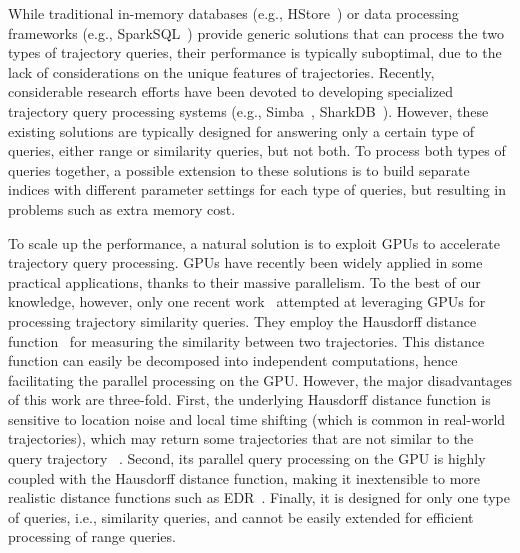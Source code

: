 \documentclass[10pt,conference,letterpaper]{IEEEtran}
\begin{document}
While traditional in-memory databases (e.g., HStore~\cite{DBLP:journals/pvldb/KallmanKNPRZJMSZHA08}) or data processing frameworks (e.g., SparkSQL~\cite{DBLP:conf/sigmod/ArmbrustXLHLBMK15}) provide generic solutions that can process the two types of trajectory queries, their performance is typically suboptimal, due to the lack of considerations on the unique features of trajectories.
Recently, considerable research efforts have been devoted to developing specialized trajectory query processing systems (e.g., Simba~\cite{DBLP:conf/sigmod/XieL0LZG16}, SharkDB~\cite{DBLP:conf/cikm/WangZXZZS14}).
However, these existing solutions are typically designed for answering only a certain type of queries, either range or similarity queries, but not both. To process both types of queries together, a possible extension to these solutions is to build separate indices with different parameter settings for each type of queries, but resulting in problems such as extra memory cost.

To scale up the performance, a natural solution is to exploit GPUs to accelerate trajectory query processing. GPUs have recently been widely applied in some practical applications, thanks to their massive parallelism.
To the best of our knowledge, however, only one recent work~\cite{DBLP:conf/bigdataconf/LealGZY15} attempted at leveraging GPUs for processing trajectory similarity  queries. They employ the Hausdorff distance function~\cite{munkres2000topology} for measuring the similarity between two trajectories.  This distance function can easily be decomposed into independent computations, hence facilitating the parallel processing on the GPU. However, the major disadvantages of this work are three-fold. First, the underlying Hausdorff distance function is sensitive to location noise and local time shifting (which is common in real-world trajectories), which may return some trajectories that are not similar to the query trajectory ~\cite{EDWP15}. Second, its parallel query processing on the GPU is highly coupled with the Hausdorff distance function, making it inextensible to more realistic distance functions such as EDR~\cite{DBLP:conf/sigmod/ChenOO05}. Finally, it is designed for only one type of queries, i.e., similarity queries, and cannot be easily extended for efficient processing of range queries.
\end{document}
